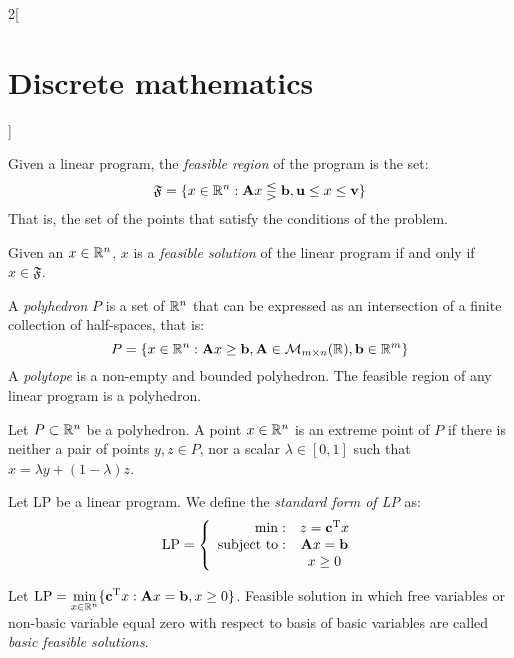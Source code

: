 \documentclass[../../../main.tex]{subfiles}
\begin{document}
\begin{multicols}{2}[\section{Discrete mathematics}]
\begin{definition}
  \end{definition}
  \begin{definition}
    Given a linear program, the \textit{feasible region} of the program is the set: $$\mathfrak{F}=\{x\in\mathbb{R} ^n:\boldsymbol{\mathrm{A}}x\lesseqgtr \boldsymbol{\mathrm{b}},\boldsymbol{\mathrm{u}}\leq x\leq \boldsymbol{\mathrm{v}}\}$$ That is, the set of the points that satisfy the conditions of the problem.
  \end{definition}
  \begin{prop}
    Given an $x\in\mathbb{R} ^n$, $x$ is a \textit{feasible solution} of the linear program if and only if $x\in\mathfrak{F}$.
  \end{prop}
  \begin{definition}
    A \textit{polyhedron} $P$ is a set of $\mathbb{R} ^n$ that can be expressed as an intersection of a finite collection of half-spaces, that is: $$P=\{x\in\mathbb{R} ^n:\boldsymbol{\mathrm{A}}x\geq \boldsymbol{\mathrm{b}}, \boldsymbol{\mathrm{A}}\in\mathcal{M}_{m\times n}(\mathbb{R} ),\boldsymbol{\mathrm{b}}\in\mathbb{R} ^m\}$$ A \textit{polytope} is a non-empty and bounded polyhedron. The feasible region of any linear program is a polyhedron.
  \end{definition}
  \begin{definition}
    Let $P\subset\mathbb{R} ^n$ be a polyhedron. A point $x\in\mathbb{R} ^n$ is an extreme point of $P$ if there is neither a pair of points $y,z\in P$, nor a scalar $\lambda\in[0,1]$ such that $x=\lambda y+(1-\lambda)z$.
  \end{definition}
  \begin{definition}
    Let LP be a linear program. We define the \textit{standard form of LP} as:
    $$\text{LP}=\left\{
      \begin{array}{rc}
        \min:              & z=\vb{c}^{\mathrm{T}}x                       \\
        \text{subject to}: & \boldsymbol{\mathrm{A}}x=\boldsymbol{\mathrm{b}} \\
                           & x\geq 0
      \end{array}\right.$$
  \end{definition}
  \begin{definition}
    Let $\displaystyle \text{LP}=\min_{x\in\mathbb{R} ^n}\{\vb{c}^{\mathrm{T}}x:\boldsymbol{\mathrm{A}}x=\boldsymbol{\mathrm{b}},x\geq 0\}$. Feasible solution in which free variables or non-basic variable equal zero with respect to basis of basic variables are called \textit{basic feasible solutions}.
  \end{definition}
  \begin{prop}

\end{prop}
\end{multicols}
\end{document}

